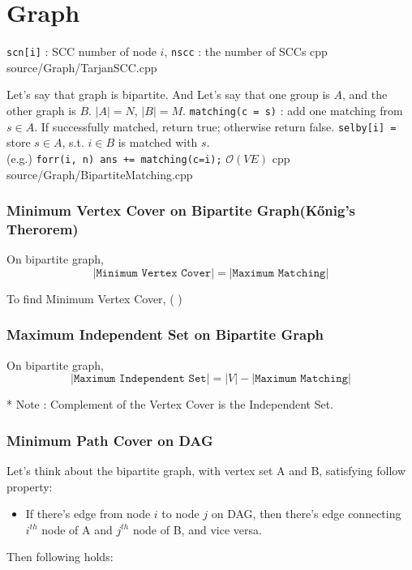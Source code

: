 \documentclass[portrait, 8pt, a4paper, oneside, twocolumn]{extarticle}
\begin{document}
\section{Graph}

{\texttt{scn[i]} : SCC number of node $i$, \texttt{nscc} : the number of SCCs}
{}
{cpp}
{source/Graph/TarjanSCC.cpp}

{Let's say that graph is bipartite. And Let's say that one group is $A$, and the other graph is $B$. $|A|=N$, $|B|=M$. \texttt{matching(c = s)} : add one matching from $s \in A$. If successfully matched, return true; otherwise return false. \texttt{selby[i] = } store $s\in A$, s.t. $i\in B$ is matched with $s$. \\ (e.g.) \texttt{forr(i, n) ans += matching(c=i);}}
{$\mathcal O(VE)$}
{cpp}
{source/Graph/BipartiteMatching.cpp}

\subsubsection{Minimum Vertex Cover on Bipartite Graph(Kőnig's Therorem)}
On bipartite graph, $$|\texttt{Minimum Vertex Cover}| = |\texttt{Maximum Matching}|$$

To find Minimum Vertex Cover, ( \added )

\subsubsection{Maximum Independent Set on Bipartite Graph}
On bipartite graph, $$|\texttt{Maximum Independent Set}|=|V|-|\texttt{Maximum Matching}|$$

* Note : Complement of the Vertex Cover is the Independent Set.

\subsubsection{Minimum Path Cover on DAG}
Let's think about the bipartite graph, with vertex set A and B, satisfying follow property:

\begin{itemize}
    \item If there's edge from node $i$ to node $j$ on DAG, then there's edge connecting $i^{th}$ node of A and $j^{th}$ node of B, and vice versa.
\end{itemize}

Then following holds:
\end{document}
